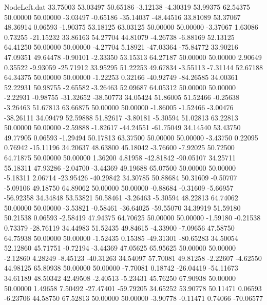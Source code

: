 \begin{filecontents}{NodeLeft.dat}
  33.75003   53.03497   50.65186    -3.12138   -4.30319   53.99375   62.54375   50.00000   50.00000   -3.03497   -0.65186  -35.14037  -48.44516
  33.81089   53.37067   48.36914     0.06593   -1.90375   53.18125   63.03125   50.00000   50.00000   -3.37067    1.63086    0.73255  -21.15232
  33.86163   54.27704   44.81079    -4.26738   -6.88169   52.13125   64.41250   50.00000   50.00000   -4.27704    5.18921  -47.03364  -75.84772
  33.90216   47.09351   49.64478    -0.90101   -2.33350   53.15313   64.27187   50.00000   50.00000    2.90649    0.35522   -9.93059  -25.71912
  33.95295   51.22253   49.67834    -3.55113   -7.31144   52.67188   64.34375   50.00000   50.00000   -1.22253    0.32166  -40.92749  -84.26585
  34.00361   52.22931   50.98755    -2.65582   -3.26463   52.09687   64.05312   50.00000   50.00000   -2.22931   -0.98755  -31.32652  -38.50773
  34.05424   51.86005   51.52466    -0.25638   -3.26463   51.67813   63.66875   50.00000   50.00000   -1.86005   -1.52466   -3.00476  -38.26111
  34.09479   52.59888   51.82617    -3.80181   -5.30594   51.02813   63.22813   50.00000   50.00000   -2.59888   -1.82617  -44.24551  -61.75049
  34.14540   53.43750   49.77905     0.06593   -1.29494   50.17813   63.37500   50.00000   50.00000   -3.43750    0.22095    0.76942  -15.11196
  34.20637   48.63800   45.18042    -3.76600   -7.92025   50.72500   64.71875   50.00000   50.00000    1.36200    4.81958  -42.81842  -90.05107
  34.25711   55.18311   47.93286    -2.04700   -3.44369   49.19688   65.07500   50.00000   50.00000   -5.18311    2.06714  -23.95426  -40.29842
  34.30785   50.88684   50.31609    -0.50707   -5.09106   49.18750   64.89062   50.00000   50.00000   -0.88684   -0.31609   -5.66957  -56.92358
  34.34848   53.53821   50.58461    -3.26463   -5.30594   48.22813   64.74062   50.00000   50.00000   -3.53821   -0.58461  -36.64025  -59.55070
  34.39919   51.59180   50.21538     0.06593   -2.58419   47.94375   64.70625   50.00000   50.00000   -1.59180   -0.21538    0.73379  -28.76119
  34.44983   51.52435   49.84615    -4.33900   -7.09656   47.58750   64.75938   50.00000   50.00000   -1.52435    0.15385  -49.31301  -80.65283
  34.50054   52.12860   45.71751    -0.72194   -3.44369   47.05625   65.95625   50.00000   50.00000   -2.12860    4.28249   -8.45123  -40.31263
  34.54097   57.70081   49.81258    -2.22607   -4.62550   44.98125   65.80938   50.00000   50.00000   -7.70081    0.18742  -26.04419  -54.11673
  34.61189   48.50342   42.49508    -2.40513   -5.23431   45.76250   67.90938   50.00000   50.00000    1.49658    7.50492  -27.47401  -59.79205
  34.65252   53.90778   50.11471     0.06593   -6.23706   44.58750   67.52813   50.00000   50.00000   -3.90778   -0.11471    0.74066  -70.06577

\end{filecontents}
